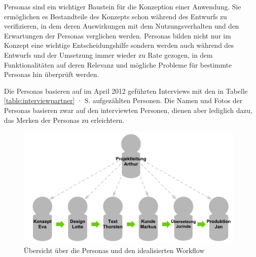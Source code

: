 Personas sind ein wichtiger Baustein für die Konzeption einer Anwendung. Sie ermöglichen es Bestandteile des Konzepts schon während des Entwurfs zu verifizieren, in dem deren Auswirkungen mit dem Nutzungsverhalten und den Erwartungen der Personas verglichen werden. Personas bilden nicht nur im Konzept eine wichtige Entscheidungshilfe sondern werden auch während des Entwurfs und der Umsetzung immer wieder zu Rate gezogen, in dem Funktionalitäten auf deren Relevanz und mögliche Probleme für bestimmte Personas hin überprüft werden. \cite[S.38 ff.]{cohn2004user}

Die Personas basieren auf im April 2012 geführten Interviews mit den in Tabelle \ref{table:interviewpartner} · S.\pageref{table:interviewpartner} aufgezählten Personen. Die Namen und Fotos der Personas basieren zwar auf den interviewten Personen, dienen aber lediglich dazu, das Merken der Personas zu erleichtern.

\begin{figure}[htb]
\begin{center}
\includegraphics[width=\textwidth]{media/Uebersicht-Personas.pdf}
\caption{Übersicht über die Personas und den idealisierten Workflow}
\label{chart:uebersicht-personas}
\end{center}
\end{figure}

